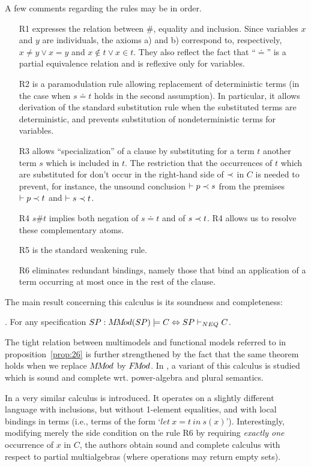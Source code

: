 {A few comments regarding the rules may be in order.
\begin{itemize}\MyLPar
\item[R1] expresses the relation between $\#$, equality and inclusion. 
Since variables $x$ and $y$ are individuals, the 
 axioms a) and b) correspond to, respectively, $x\not= y\lor 
 x=y$ and $x\not\in t\lor x\in t$. They also reflect the fact that 
 ``$\doteq$'' is a partial equivalence relation and is reflexive only for variables.  
\item[R2] is a paramodulation rule allowing replacement of deterministic 
terms (in the case when $s\doteq t$ holds in 
the second assumption). In particular, it allows derivation of the standard substitution rule when the 
substituted terms are deterministic, and prevents substitution of nondeterministic terms for variables.
\item[R3] allows ``specialization'' of a clause by substituting for a term 
$t$ another term $s$ which is included in $t$. The 
restriction that the occurrences of $t$ which are substituted for don't 
occur in the right-hand side of $\mathrel{\prec}$ in $C$ 
is needed to prevent, for instance, the unsound conclusion $\vdash p\mathrel{\prec} 
s$ from the premises $\vdash p\mathrel{\prec} t$ and $\vdash s\mathrel{\prec} t$.
\item[R4] $s\# t$ implies both negation of $s\doteq t$ and of $s\mathrel{\prec} 
t$. R4 allows us to resolve these complementary atoms.  
\item[R5] is the standard weakening rule.
\item[R6] eliminates redundant bindings, namely those that bind an application of a term occurring at most once 
in the rest of the clause.
\end{itemize}
The main result concerning this calculus is its soundness and completeness:

\begin{Theorem} 
{\rm\cite{c:127, c:126}.} For any specification $SP: M\!M\!od(SP)\models C \mathrel{\Leftrightarrow} 
SP\vdash_{NEQ} C$.
\end{Theorem}
The tight relation between multimodels and functional models referred to 
in proposition~\ref{prop:26} is further 
strengthened by the fact that the same theorem holds when we replace 
$M\!M\!od$ by $F\!M\!od$. In \cite{c:130}, a variant of this calculus is studied which
is sound and complete wrt. power-algebra and plural semantics.

In \cite{c:Bia1, c:Bia} a very similar calculus is introduced. It operates on
a slightly different language with inclusions, but without 1-element
equalities, and with local bindings in terms (i.e., terms of the form
`$let\ x=t\ in\ s(x)$').  Interestingly, modifying merely the side
condition on the rule R6 by requiring {\em exactly one} occurrence of
$x$ in $C$, the authors obtain sound and complete calculus with
respect to partial multialgebras (where operations may return empty
sets).

}
